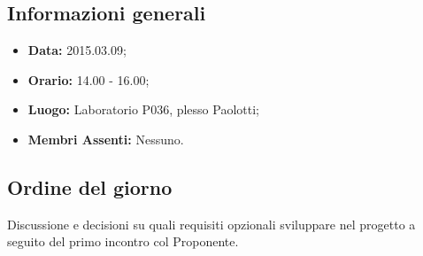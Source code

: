\subsection{Informazioni generali}
\begin{itemize}
	\item \textbf{Data:} 2015.03.09;
	\item \textbf{Orario:} 14.00 - 16.00;
	\item \textbf{Luogo:} Laboratorio P036, plesso Paolotti;
	\item \textbf{Membri Assenti:} Nessuno.
\end{itemize}

\subsection{Ordine del giorno}
Discussione e decisioni su quali requisiti opzionali sviluppare nel progetto \PROGETTO{} a seguito del primo incontro col Proponente.
